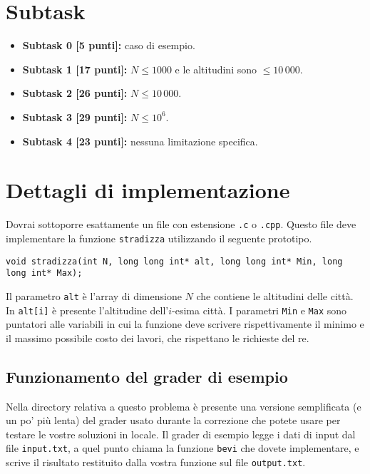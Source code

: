 \documentclass[a4paper,11pt]{article}
\newcommand{\file}[1]{\texttt{#1}}
\begin{document}
\section*{Subtask}
\begin{itemize}
\item \textbf{Subtask 0 [\phantom{1}5 punti]:} caso di esempio.
\item \textbf{Subtask 1 [17 punti]:} $N\le 1000$ e le altitudini sono $\le 10\,000$.
\item \textbf{Subtask 2 [26 punti]:} $N\le 10\,000$.
\item \textbf{Subtask 3 [29 punti]:} $N\le 10^6$.
\item \textbf{Subtask 4 [23 punti]:} nessuna limitazione specifica.
\end{itemize}



\section*{Dettagli di implementazione}
Dovrai sottoporre esattamente un file con estensione \texttt{.c} o
\texttt{.cpp}. Questo file deve implementare la funzione
\texttt{stradizza} utilizzando il seguente prototipo.

\begin{verbatim}
void stradizza(int N, long long int* alt, long long int* Min, long long int* Max);
\end{verbatim}

Il parametro \verb|alt| è l'array di dimensione $N$ che contiene le
altitudini delle città. In \verb|alt[i]| è presente l'altitudine
dell'$i$-esima città.  I parametri \verb|Min| e \verb|Max| sono
puntatori alle variabili in cui la funzione deve scrivere
rispettivamente il minimo e il massimo possibile costo dei lavori, che
rispettano le richieste del re.

\subsection*{Funzionamento del grader di esempio}
Nella directory relativa a questo problema è presente una versione
semplificata (e un po' più lenta) del grader usato durante la
correzione che potete usare per testare le vostre soluzioni in
locale. Il grader di esempio legge i dati di input dal file
\file{input.txt}, a quel punto chiama la funzione \verb|bevi| che
dovete implementare, e scrive il risultato restituito dalla vostra
funzione sul file \file{output.txt}.
\end{document}
